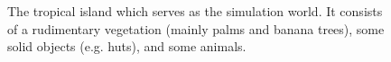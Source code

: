 \documentclass{sig-alternate-05-2015}
\begin{document}
\begin{figure}[bth!]
{}

\caption{The tropical island which serves as the simulation world. It consists of a rudimentary vegetation (mainly palms and banana trees), some solid objects (e.g. huts), and some animals.}
\label{fig:island_several}
\end{figure}
\end{document}
